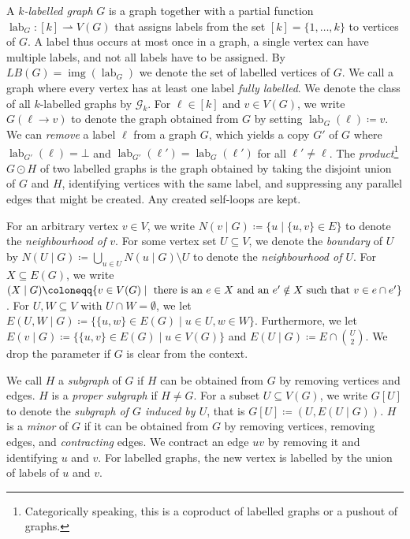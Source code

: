 \documentclass{lmcs}
\theoremstyle{plain}\newtheorem{claim}[thm]{Claim}   %
\newcommand{\cG}{\ensuremath{\mathcal G}}
\DeclareMathOperator{\img}{img}
\let\boundary\relax
\newcommand{\boundary}{\Delta}
\newcommand{\fktmid}{\ensuremath{\mid}}
\newcommand{\parto}{\ensuremath{\rightharpoonup}}
\DeclareMathOperator{\labfkt}{lab}
\newcommand{\labels}[1]{\ensuremath{LB(#1)}}
\begin{document}
A \emph{$k$-labelled graph} $G$ is a graph together with a partial function $\labfkt_G \colon [k] \parto V(G)$ that assigns labels from the set $[k] = \{1, \dots, k\}$ to vertices of $G$.
A label thus occurs at most once in a graph, a single vertex can have multiple labels, and not all labels have to be assigned.
By $\labels{G}=\img(\labfkt_G)$ we denote the set of labelled vertices of $G$.
We call a graph where every vertex has at least one label \emph{fully labelled}.
We denote the class of all $k$-labelled graphs by $\cG_k$.
For $\ell \in [k]$ and $v \in V(G)$, we write $G(\ell \to v)$ to denote the graph obtained from $G$ by setting $\labfkt_G(\ell) \coloneqq v$.
We can \emph{remove} a label $\ell$ from a graph $G$, which yields a copy $G'$ of $G$ where $\labfkt_{G'}(\ell) = \bot$ and $\labfkt_{G'}(\ell') = \labfkt_G(\ell')$ for all $\ell' \neq \ell$.
The \emph{product}\footnote{Categorically speaking, this is a coproduct of labelled graphs or a pushout of graphs.} $G\odot H$ of two labelled graphs is the graph obtained by taking the disjoint union of $G$ and $H$, identifying vertices with the same label, and suppressing any parallel edges that might be created. Any created self-loops are kept.

For an arbitrary vertex \(v\in V\), we write \(N(v\fktmid G)\coloneqq\{u\mid \{u,v\}\in E\}\) to denote the \emph{neighbourhood of \(v\)}.
For some vertex set $U\subseteq V$, we denote the \emph{boundary} of $U$ by \(N(U\fktmid G)\coloneqq\bigcup_{u\in U} N(u\fktmid G)\setminus U\) to denote the \emph{neighbourhood of \(U\)}.
For $X\subseteq E(G)$, we write $\boundary(X\fktmid G)\coloneqq\{v\in V(G)\mid \text{ there is an } e\in X \text{ and an } e'\notin X \text{ such that } v\in e\cap e' \}$.
For $U,W\subseteq V$ with $U\cap W=\emptyset$, we let $E(U,W\fktmid G) \coloneqq \{\{u,w\}\in E(G)\mid u\in U,w \in W \}$.
Furthermore, we let $E(v\fktmid G) \coloneqq \{ \{u,v\}\in E(G)\mid u\in V(G)\}$ and $E(U\fktmid G) \coloneqq E\cap\binom{U}{2}$.
We drop the parameter if $G$ is clear from the context.

We call $H$ a \emph{subgraph} of $G$ if $H$ can be obtained from $G$ by removing vertices and edges.
$H$ is a \emph{proper subgraph} if $H\neq G$.
For a subset $U\subseteq V(G)$, we write $G[U]$ to denote the \emph{subgraph of $G$ induced by $U$}, that is $G[U]\coloneqq(U,E(U\fktmid G))$.
$H$ is a \emph{minor} of $G$ if it can be obtained from $G$ by removing vertices, removing edges, and \emph{contracting} edges. We contract an edge $uv$ by removing it and identifying $u$ and $v$. For labelled graphs, the new vertex is labelled by the union of labels of $u$ and $v$.
\end{document}
